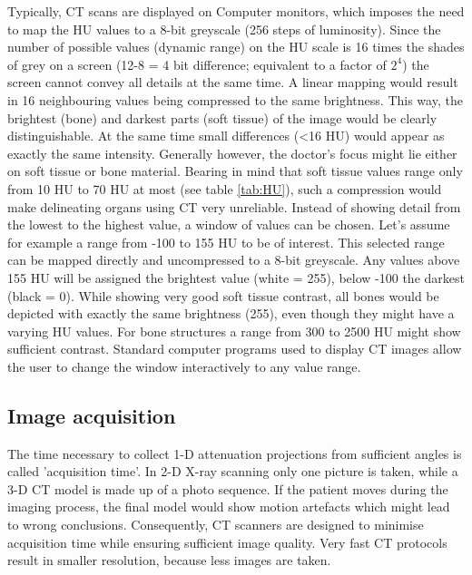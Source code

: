 Typically, CT scans are displayed on Computer monitors, which imposes the need to map the HU values to a 8-bit greyscale (256 steps of luminosity).
Since the number of possible values (dynamic range) on the HU scale is 16 times the shades of grey on a screen (12-8 = 4 bit difference; equivalent to a factor of $2^4$) the screen cannot convey all details at the same time.
A linear mapping would result in 16 neighbouring values being compressed to the same brightness.
This way, the brightest (bone) and darkest parts (soft tissue) of the image would be clearly distinguishable.
At the same time small differences (<16 HU) would appear as exactly the same intensity.
Generally however, the doctor's focus might lie either on soft tissue or bone material.
Bearing in mind that soft tissue values range only from 10 HU to 70 HU at most (see table \ref{tab:HU}), such a compression would make delineating organs using CT very unreliable.
Instead of showing detail from the lowest to the highest value, a window of values can be chosen.
Let's assume for example a range from -100 to 155 HU to be of interest.
This selected range can be mapped directly and uncompressed to a 8-bit greyscale.
Any values above 155 HU will be assigned the brightest value (white = 255), below -100 the darkest (black = 0).
While showing very good soft tissue contrast, all bones would be depicted with exactly the same brightness (255), even though they might have a varying HU values.
For bone structures a range from 300 to 2500 HU might show sufficient contrast.
Standard computer programs used to display CT images allow the user to change the window interactively to any value range.

\subsection{Image acquisition}
The time necessary to collect 1-D attenuation projections from sufficient angles is called 'acquisition time'.
In 2-D X-ray scanning only one picture is taken, while a 3-D CT model is made up of a photo sequence.
If the patient moves during the imaging process, the final model would show motion artefacts which might lead to wrong conclusions.
Consequently, CT scanners are designed to minimise acquisition time while ensuring sufficient image quality.
Very fast CT protocols result in smaller resolution, because less images are taken.

